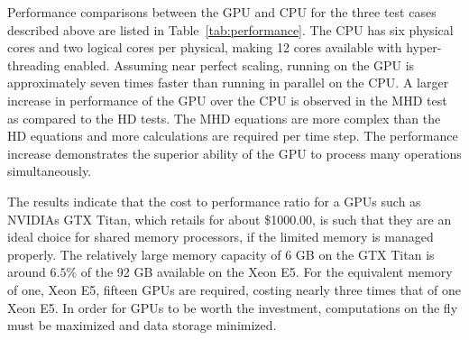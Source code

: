 Performance comparisons between the GPU and CPU for the three test cases described above are listed in Table~\ref{tab:performance}.  The CPU has six physical cores and two logical cores per physical, making 12 cores available with hyper-threading enabled.  Assuming near perfect scaling, running on the GPU is approximately seven times faster than running in parallel on the CPU.  A larger increase in performance of the GPU over the CPU is observed in the MHD test as compared to the HD tests.  The MHD equations are more complex than the HD equations and more calculations are required per time step.  The performance increase demonstrates the superior ability of the GPU to process many operations simultaneously.  

 The results indicate that the cost to performance ratio for a  GPUs such as NVIDIAs GTX Titan, which retails for about \$1000.00, is such that they are an ideal choice for shared memory processors, if the limited memory is managed properly.  The relatively large memory capacity of 6 GB on the GTX Titan is around $6.5\%$ of the 92 GB available on the Xeon E5.  For the equivalent memory of one, Xeon E5, fifteen GPUs are required, costing nearly three times that of one Xeon E5.  In order for GPUs to be worth the investment, computations on the fly must be maximized and data storage minimized.  




